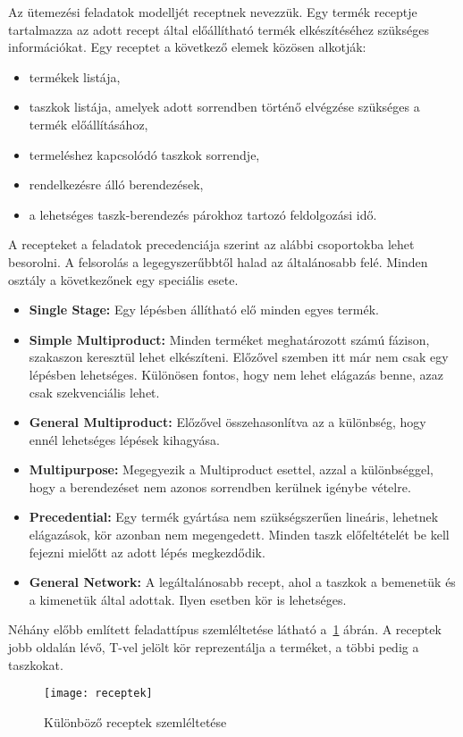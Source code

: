 Az ütemezési feladatok modelljét receptnek nevezzük. Egy termék receptje tartalmazza az adott recept által előállítható termék elkészítéséhez szükséges információkat\cite{Hegyhati}. Egy receptet a következő elemek közösen alkotják:
\begin{itemize}
  \item termékek listája,
  \item taszkok listája, amelyek adott sorrendben történő elvégzése szükséges a termék előállításához,
  \item termeléshez kapcsolódó taszkok sorrendje,
  \item rendelkezésre álló berendezések,
  \item a lehetséges taszk-berendezés párokhoz tartozó feldolgozási idő.
\end{itemize}
A recepteket a feladatok precedenciája szerint az alábbi csoportokba lehet besorolni. A felsorolás a legegyszerűbbtől halad az általánosabb felé. Minden osztály a következőnek egy speciális esete.
\begin{itemize}
	\item \textbf{Single Stage:} Egy lépésben állítható elő minden egyes termék.
	\item \textbf{Simple Multiproduct:} Minden terméket meghatározott számú fázison, szakaszon keresztül lehet elkészíteni. Előzővel szemben itt már nem csak egy lépésben lehetséges. Különösen fontos, hogy nem lehet elágazás benne, azaz csak szekvenciális lehet.
	\item \textbf{General Multiproduct:} Előzővel összehasonlítva az a különbség, hogy ennél lehetséges lépések kihagyása.
	\item \textbf{Multipurpose:} Megegyezik a Multiproduct esettel, azzal a különbséggel, hogy a berendezéset nem azonos sorrendben kerülnek igénybe vételre.
	\item \textbf{Precedential:} Egy termék gyártása nem szükségszerűen lineáris, lehetnek elágazások, kör azonban nem megengedett. Minden taszk előfeltételét be kell fejezni mielőtt az adott lépés megkezdődik. 
	\item \textbf{General Network:} A legáltalánosabb recept, ahol a taszkok a bemenetük és a kimenetük által adottak. Ilyen esetben kör is lehetséges.
\end{itemize}
Néhány előbb említett feladattípus szemléltetése látható a~\ref{receptek} ábrán. A receptek jobb oldalán lévő, T-vel jelölt kör reprezentálja a terméket, a többi pedig a taszkokat.
\begin{figure}[H]	
\begin{center}
\texttt{[image: receptek]}
\caption{Különböző receptek szemléltetése}
\label{receptek}
\end{center}
\end{figure}
